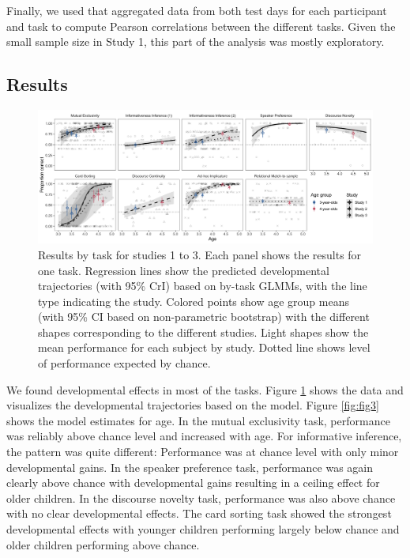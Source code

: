 \documentclass[
  man,floatsintext]{apa6}
\begin{document}
Finally, we used that aggregated data from both test days for each participant and task to compute Pearson correlations between the different tasks. Given the small sample size in Study 1, this part of the analysis was mostly exploratory.

\hypertarget{results}{%
\subsection{Results}\label{results}}



\begin{figure}

{\centering \includegraphics[width=1\linewidth]{./figures/figure2} 

}

\caption{Results by task for studies 1 to 3. Each panel shows the results for one task. Regression lines show the predicted developmental trajectories (with 95\% CrI) based on by-task GLMMs, with the line type indicating the study. Colored points show age group means (with 95\% CI based on non-parametric bootstrap) with the different shapes corresponding to the different studies. Light shapes show the mean performance for each subject by study. Dotted line shows level of performance expected by chance.}\label{fig:fig2}
\end{figure}

We found developmental effects in most of the tasks. Figure \ref{fig:fig2} shows the data and visualizes the developmental trajectories based on the model. Figure \ref{fig:fig3} shows the model estimates for age. In the mutual exclusivity task, performance was reliably above chance level and increased with age. For informative inference, the pattern was quite different: Performance was at chance level with only minor developmental gains. In the speaker preference task, performance was again clearly above chance with developmental gains resulting in a ceiling effect for older children. In the discourse novelty task, performance was also above chance with no clear developmental effects. The card sorting task showed the strongest developmental effects with younger children performing largely below chance and older children performing above chance.
\end{document}
